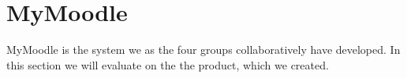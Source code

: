 \section{MyMoodle}
MyMoodle is the system we as the four groups collaboratively have developed.
In this section we will evaluate on the the product, which we created.


